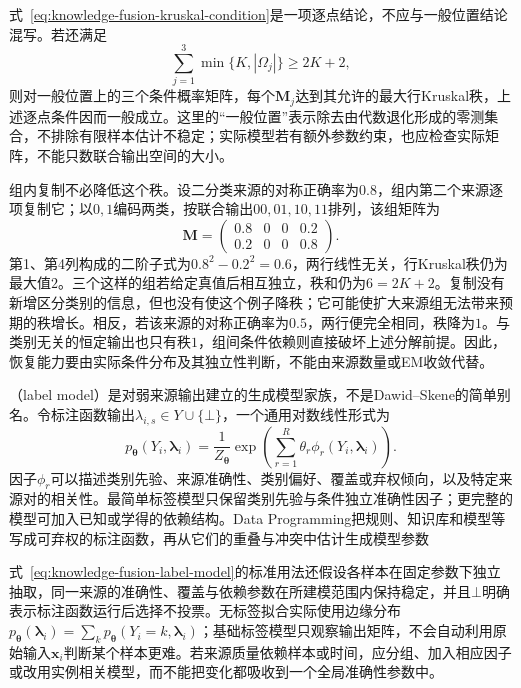 式~\eqref{eq:knowledge-fusion-kruskal-condition}是一项逐点结论，不应与一般位置结论混写。若还满足
\[
  \sum_{j=1}^{3}\min\{K,|\Omega_j|\}\geq2K+2,
\]
则对一般位置上的三个条件概率矩阵，每个$\bm{M}_j$达到其允许的最大行Kruskal秩，上述逐点条件因而一般成立。这里的“一般位置”表示除去由代数退化形成的零测集合，不排除有限样本估计不稳定；实际模型若有额外参数约束，也应检查实际矩阵，不能只数联合输出空间的大小。

组内复制不必降低这个秩。设二分类来源的对称正确率为$0.8$，组内第二个来源逐项复制它；以$0,1$编码两类，按联合输出$00,01,10,11$排列，该组矩阵为
\[
  \bm{M}
  =\begin{pmatrix}
    0.8 & 0 & 0 & 0.2\\
    0.2 & 0 & 0 & 0.8
  \end{pmatrix}.
\]
第1、第4列构成的二阶子式为$0.8^2-0.2^2=0.6$，两行线性无关，行Kruskal秩仍为最大值$2$。三个这样的组若给定真值后相互独立，秩和仍为$6=2K+2$。复制没有新增区分类别的信息，但也没有使这个例子降秩；它可能使扩大来源组无法带来预期的秩增长。相反，若该来源的对称正确率为$0.5$，两行便完全相同，秩降为$1$。与类别无关的恒定输出也只有秩$1$，组间条件依赖则直接破坏上述分解前提。因此，恢复能力要由实际条件分布及其独立性判断，不能由来源数量或EM收敛代替。

（label model）是对弱来源输出建立的生成模型家族，不是Dawid--Skene的简单别名。令标注函数输出$\lambda_{i,s}\in Y\cup\{\bot\}$，一个通用对数线性形式为
\begin{equation}
  p_{\bm{\theta}}(Y_i,\bm{\lambda}_i)
  =\frac{1}{Z_{\bm{\theta}}}
  \exp\left(
    \sum_{r=1}^{R}\theta_r
    \phi_r(Y_i,\bm{\lambda}_i)
  \right).
  \label{eq:knowledge-fusion-label-model}
\end{equation}
因子$\phi_r$可以描述类别先验、来源准确性、类别偏好、覆盖或弃权倾向，以及特定来源对的相关性。最简单标签模型只保留类别先验与条件独立准确性因子；更完整的模型可加入已知或学得的依赖结构。Data Programming把规则、知识库和模型等写成可弃权的标注函数，再从它们的重叠与冲突中估计生成模型参数

式~\eqref{eq:knowledge-fusion-label-model}的标准用法还假设各样本在固定参数下独立抽取，同一来源的准确性、覆盖与依赖参数在所建模范围内保持稳定，并且$\bot$明确表示标注函数运行后选择不投票。无标签拟合实际使用边缘分布$p_{\bm{\theta}}(\bm{\lambda}_i)=\sum_k p_{\bm{\theta}}(Y_i=k,\bm{\lambda}_i)$；基础标签模型只观察输出矩阵，不会自动利用原始输入$\bm{x}_i$判断某个样本更难。若来源质量依赖样本或时间，应分组、加入相应因子或改用实例相关模型，而不能把变化都吸收到一个全局准确性参数中。

